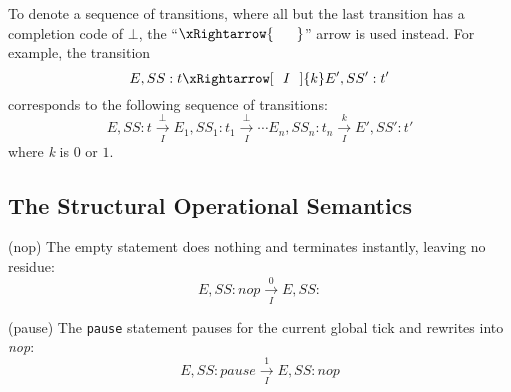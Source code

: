To denote a sequence of transitions, where all but the last transition has 
a completion code of $\bot$, the ``$\xRightarrow{~~~~~}$'' arrow is used 
instead. For example, the transition
\begin{equation*}
	E, SS: t \xRightarrow[~~I~~]{k} E', SS': t'
\end{equation*}
corresponds to the following sequence of transitions:
\begin{equation*}
	E, SS: t \xrightarrow[~~I~~]{\bot} E_1, SS_1: t_1 \xrightarrow[~~I~~]{\bot} \cdots E_n, SS_n: t_n \xrightarrow[~~I~~]{k} E', SS': t'
\end{equation*}
where \emph{k} is $0$ or $1$.


\subsection{The Structural Operational Semantics}

\noindent (nop) The empty statement does nothing and terminates instantly, 
leaving no residue:
\begin{equation*}	
	\tag{nop}
	\label{forec:nop}
	E, SS: nop 
		\xrightarrow[~~I~~]{0} 
	E, SS: 
\end{equation*}

\noindent (pause) The \verb$pause$ statement pauses for the current global 
tick and rewrites into \emph{nop}:
\begin{equation*}
	\tag{pause}
	\label{forec:pause}
	E, SS: pause 
		\xrightarrow[~~I~~]{1} 
	E, SS: nop
\end{equation*}

